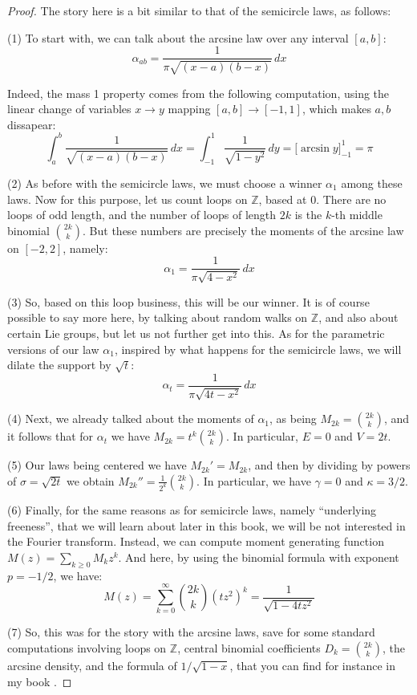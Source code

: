 \documentclass[12pt]{amsbook}
\begin{document}
\begin{proof}
The story here is a bit similar to that of the semicircle laws, as follows:

\medskip

(1) To start with, we can talk about the arcsine law over any interval $[a,b]$:
$$\alpha_{ab}=\frac{1}{\pi\sqrt{(x-a)(b-x)}}\,dx$$

Indeed, the mass 1 property comes from the following computation, using the linear change of variables $x\to y$ mapping $[a,b]\to[-1,1]$, which makes $a,b$ dissapear:
$$\int_a^b\frac{1}{\sqrt{(x-a)(b-x)}}\,dx=\int_{-1}^1\frac{1}{\sqrt{1-y^2}}\,dy=\Big[\arcsin y\Big]_{-1}^1=\pi$$

(2) As before with the semicircle laws, we must choose a winner $\alpha_1$ among these laws. Now for this purpose, let us count loops on $\mathbb Z$, based at $0$. There are no loops of odd length, and the number of loops of length $2k$ is the $k$-th middle binomial $\binom{2k}{k}$. But these numbers are precisely the moments of the arcsine law on $[-2,2]$, namely:
$$\alpha_1=\frac{1}{\pi\sqrt{4-x^2}}\,dx$$

(3) So, based on this loop business, this will be our winner. It is of course possible to say more here, by talking about random walks on $\mathbb Z$, and also about certain Lie groups, but let us not further get into this. As for the parametric versions of our law $\alpha_1$, inspired by what happens for the semicircle laws, we will dilate the support by $\sqrt{t}$:
$$\alpha_t=\frac{1}{\pi\sqrt{4t-x^2}}\,dx$$

(4) Next, we already talked about the moments of $\alpha_1$, as being $M_{2k}=\binom{2k}{k}$, and it follows that for $\alpha_t$ we have $M_{2k}=t^k\binom{2k}{k}$. In particular,  $E=0$ and $V=2t$.

\medskip

(5) Our laws being centered we have $M_{2k}'=M_{2k}$, and then by dividing by powers of $\sigma=\sqrt{2t}$ we obtain $M_{2k}''=\frac{1}{2^k}\binom{2k}{k}$. In particular, we have $\gamma=0$ and $\kappa=3/2$.

\medskip

(6) Finally, for the same reasons as for semicircle laws, namely ``underlying freeness'', that we will learn about later in this book, we will be not interested in the Fourier transform. Instead, we can compute moment generating function $M(z)=\sum_{k\geq0}M_kz^k$. And here, by using the binomial formula with exponent $p=-1/2$, we have:
$$M(z)=\sum_{k=0}^\infty\binom{2k}{k}(tz^2)^k
=\frac{1}{\sqrt{1-4tz^2}}$$

(7) So, this was for the story with the arcsine laws, save for some standard computations involving loops on $\mathbb Z$, central binomial coefficients $D_k=\binom{2k}{k}$, the arcsine density, and the formula of $1/\sqrt{1-x}$, that you can find for instance in my book \cite{ba2}.
\end{proof}
\end{document}
